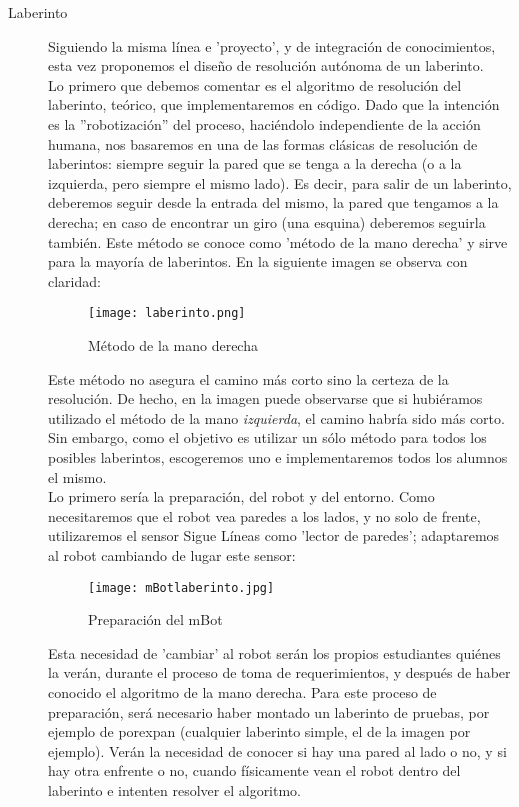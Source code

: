 \begin{description}
	
	\item[Laberinto] \label{ej:laberinto}
	Siguiendo la misma línea e 'proyecto', y de integración de conocimientos, esta vez proponemos el diseño de resolución autónoma de un laberinto. \\
	Lo primero que debemos comentar es el algoritmo de resolución del laberinto, teórico, que implementaremos en código. Dado que la intención es la ''robotización'' del proceso, haciéndolo independiente de la acción humana, nos basaremos en una de las formas clásicas de resolución de laberintos: siempre seguir la pared que se tenga a la derecha (o a la izquierda, pero siempre el mismo lado). Es decir, para salir de un laberinto, deberemos seguir desde la entrada del mismo, la pared que tengamos a la derecha; en caso de encontrar un giro (una esquina) deberemos seguirla también. Este método se conoce como 'método de la mano derecha' y sirve para la mayoría de laberintos. En la siguiente imagen se observa con claridad:
	\begin{figure}[H]
		\texttt{[image: laberinto.png]}
		\centering
		\label{img:laberinto}
		\caption{Método de la mano derecha}
	\end{figure}
	Este método no asegura el camino más corto sino la certeza de la resolución. De hecho, en la imagen puede observarse que si hubiéramos utilizado el método de la mano \textit{izquierda}, el camino habría sido más corto. Sin embargo, como el objetivo es utilizar un sólo método para todos los posibles laberintos, escogeremos uno e implementaremos todos los alumnos el mismo. \\
	Lo primero sería la preparación, del robot y del entorno. Como necesitaremos que el robot vea paredes a los lados, y no solo de frente, utilizaremos el sensor Sigue Líneas como 'lector de paredes'; adaptaremos al robot cambiando de lugar este sensor:
	\begin{figure}[H]
		\texttt{[image: mBotlaberinto.jpg]}
		\centering
		\label{img:mBotlaberinto}
		\caption{Preparación del mBot}
	\end{figure}
	Esta necesidad de 'cambiar' al robot serán los propios estudiantes quiénes la verán, durante el proceso de toma de requerimientos, y después de haber conocido el algoritmo de la mano derecha. Para este proceso de preparación, será necesario haber montado un laberinto de pruebas, por ejemplo de porexpan (cualquier laberinto simple, el de la imagen por ejemplo). Verán la necesidad de conocer si hay una pared al lado o no, y si hay otra enfrente o no, cuando físicamente vean el robot dentro del laberinto e intenten resolver el algoritmo. \\

\end{description}
